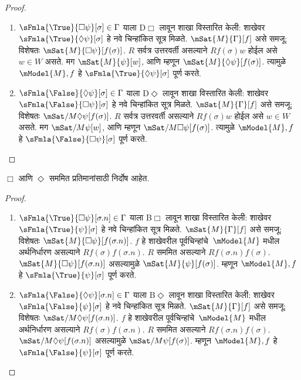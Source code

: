 \begin{proof}
\begin{enumerate}
\item $\sFmla{\True}{\Box \psi}[\sigma] \in \Gamma$
  याला D$\Box$ लावून शाखा विस्तारित केली:
  शाखेवर
    $\sFmla{\True}{\Diamond \psi}[\sigma]$ हे नवे
    चिन्हांकित सूत्र मिळते. $\mSat{M}{\Gamma}[f]$
    असे समजू; विशेषतः
    $\mSat{M}{\Box \psi}[f(\sigma)]$.
    $R$ सर्वत्र उत्तरवर्ती असल्याने
    $Rf(\sigma)w$ होईल असे $w
    \in W$ असते. मग $\mSat{M}{\psi}[w]$,
    आणि म्हणून $\mSat{M}{\Diamond \psi}[f(\sigma)]$.
    त्यामुळे $\mModel{M}, f$ हे
    $\sFmla{\True}{\Diamond\psi}[\sigma]$ पूर्ण करते.
\item $\sFmla{\False}{\Diamond \psi}[\sigma] \in \Gamma$
  याला D$\Diamond$ लावून शाखा विस्तारित केली:
  शाखेवर
    $\sFmla{\False}{\Box \psi}[\sigma]$ हे नवे
    चिन्हांकित सूत्र मिळते. $\mSat{M}{\Gamma}[f]$
    असे समजू; विशेषतः
    $\mSat/{M}{\Diamond \psi}[f(\sigma)]$.
    $R$ सर्वत्र उत्तरवर्ती असल्याने
    $Rf(\sigma)w$ होईल असे $w
    \in W$ असते. मग $\mSat/{M}{\psi}[w]$,
    आणि म्हणून $\mSat/{M}{\Box \psi}[f(\sigma)]$.
    त्यामुळे $\mModel{M}, f$ हे
    $\sFmla{\False}{\Box\psi}[\sigma]$ पूर्ण करते.
\end{enumerate}
\end{proof}
\begin{prop}
  \label{nml:tab:msn:prop:soundness-B}
  $\Box$
   आणि
  $\Diamond$
  सममित प्रतिमानांसाठी
  निर्दोष आहेत.
\end{prop}
\begin{proof}
\begin{enumerate}
\item $\sFmla{\True}{\Box \psi}[\sigma.n] \in \Gamma$
  याला B$\Box$ लावून शाखा विस्तारित केली:
  शाखेवर
    $\sFmla{\True}{\psi}[\sigma]$ हे नवे चिन्हांकित सूत्र मिळते. $\mSat{M}{\Gamma}[f]$
    असे समजू; विशेषतः $\mSat{M}{\Box
      \psi}[f(\sigma.n)]$. $f$ हे शाखेवरील
    पूर्वचिन्हांचे~$\mModel{M}$ मधील
    अर्थनिर्धारण असल्याने
    $Rf(\sigma)f(\sigma.n)$.
    $R$ सममित असल्याने
    $Rf(\sigma.n)f(\sigma)$.
    $\mSat{M}{\Box \psi}[f(\sigma.n)]$
    असल्यामुळे $\mSat{M}{\psi}[f(\sigma)]$.
    म्हणून $\mModel{M}, f$ हे
    $\sFmla{\True}{\psi}[\sigma]$ पूर्ण करते.
\item $\sFmla{\False}{\Diamond \psi}[\sigma.n] \in \Gamma$
  याला B$\Diamond$ लावून शाखा विस्तारित केली:
  शाखेवर
    $\sFmla{\False}{\psi}[\sigma]$ हे नवे चिन्हांकित सूत्र मिळते. $\mSat{M}{\Gamma}[f]$
    असे समजू; विशेषतः $\mSat/{M}{\Diamond
      \psi}[f(\sigma.n)]$. $f$ हे शाखेवरील
    पूर्वचिन्हांचे~$\mModel{M}$ मधील
    अर्थनिर्धारण असल्याने
    $Rf(\sigma)f(\sigma.n)$.
    $R$ सममित असल्याने
    $Rf(\sigma.n)f(\sigma)$.
    $\mSat/{M}{\Diamond \psi}[f(\sigma.n)]$
    असल्यामुळे $\mSat/{M}{\psi}[f(\sigma)]$.
    म्हणून $\mModel{M}, f$ हे
    $\sFmla{\False}{\psi}[\sigma]$ पूर्ण करते.
\end{enumerate}
\end{proof}
